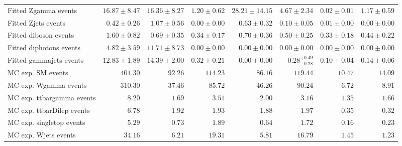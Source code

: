 \begin{table}
\begin{center}
{\begin{tabular*}{\textwidth}{@{\extracolsep{\fill}}lrrrrrrr}
        Fitted Zgamma events         & $16.87 \pm 8.47$          & $16.36 \pm 8.27$          & $1.20 \pm 0.62$          & $28.21 \pm 14.15$          & $4.67 \pm 2.34$          & $0.02 \pm 0.01$          & $1.17 \pm 0.59$              \\
        Fitted Zjets events         & $0.42 \pm 0.26$          & $1.07 \pm 0.56$          & $0.00 \pm 0.00$          & $0.63 \pm 0.32$          & $0.10 \pm 0.05$          & $0.01 \pm 0.00$          & $0.00 \pm 0.00$              \\
        Fitted diboson events         & $1.60 \pm 0.82$          & $0.69 \pm 0.35$          & $0.34 \pm 0.17$          & $0.70 \pm 0.36$          & $0.50 \pm 0.25$          & $0.33 \pm 0.18$          & $0.44 \pm 0.22$              \\
        Fitted diphotons events         & $4.82 \pm 3.59$          & $11.71 \pm 8.73$          & $0.00 \pm 0.00$          & $0.00 \pm 0.00$          & $0.00 \pm 0.00$          & $0.00 \pm 0.00$          & $0.00 \pm 0.00$              \\
        Fitted gammajets events         & $12.83 \pm 1.89$          & $14.39 \pm 2.00$          & $0.32 \pm 0.21$          & $0.00 \pm 0.00$          & $0.28_{-0.28}^{+0.49}$          & $0.10 \pm 0.04$          & $0.14 \pm 0.06$              \\
 \noalign{\smallskip}\hline\noalign{\smallskip}
MC exp. SM events              & $401.30$          & $92.26$          & $114.23$          & $86.16$          & $119.44$          & $10.47$          & $14.09$              \\
\noalign{\smallskip}\hline\noalign{\smallskip}
        MC exp. Wgamma events         & $310.30$          & $37.46$          & $85.72$          & $46.26$          & $90.24$          & $6.72$          & $8.91$              \\
        MC exp. ttbargamma events         & $8.20$          & $1.69$          & $3.51$          & $2.00$          & $3.16$          & $1.35$          & $1.66$              \\
        MC exp. ttbarDilep events         & $6.78$          & $1.92$          & $1.93$          & $1.88$          & $1.97$          & $0.35$          & $0.32$              \\
        MC exp. singletop events         & $5.29$          & $0.73$          & $1.89$          & $0.64$          & $1.72$          & $0.16$          & $0.23$              \\
        MC exp. Wjets events         & $34.16$          & $6.21$          & $19.31$          & $5.81$          & $16.79$          & $1.45$          & $1.23$              \\

\end{tabular*}}
\end{center}
\end{table}
